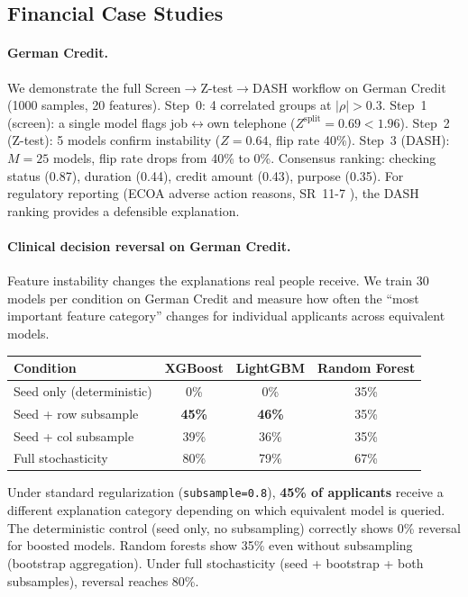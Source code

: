 \documentclass{article}
\begin{document}
\subsection{Financial Case Studies}

\paragraph{German Credit.}
We demonstrate the full Screen$\to$Z-test$\to$DASH workflow on German Credit (1000 samples, 20 features). Step~0: 4 correlated groups at $|\rho| > 0.3$. Step~1 (screen): a single model flags job$\leftrightarrow$own telephone ($Z^{\text{split}} = 0.69 < 1.96$). Step~2 (Z-test): 5 models confirm instability ($Z = 0.64$, flip rate 40\%). Step~3 (DASH): $M = 25$ models, flip rate drops from 40\% to 0\%. Consensus ranking: checking status (0.87), duration (0.44), credit amount (0.43), purpose (0.35). For regulatory reporting (ECOA adverse action reasons, SR~11-7 \citep{occ2011sr117}), the DASH ranking provides a defensible explanation.

\paragraph{Clinical decision reversal on German Credit.}
Feature instability changes the explanations real people receive. We train 30 models per condition on German Credit and measure how often the ``most important feature category'' changes for individual applicants across equivalent models.

\begin{center}
\small
\begin{tabular}{@{}lccc@{}}
\toprule
Condition & XGBoost & LightGBM & Random Forest \\
\midrule
Seed only (deterministic) & 0\% & 0\% & 35\% \\
Seed + row subsample & \textbf{45\%} & \textbf{46\%} & 35\% \\
Seed + col subsample & 39\% & 36\% & 35\% \\
Full stochasticity & 80\% & 79\% & 67\% \\
\bottomrule
\end{tabular}
\end{center}

Under standard regularization (\texttt{subsample=0.8}), \textbf{45\% of applicants} receive a different explanation category depending on which equivalent model is queried. The deterministic control (seed only, no subsampling) correctly shows 0\% reversal for boosted models. Random forests show 35\% even without subsampling (bootstrap aggregation). Under full stochasticity (seed + bootstrap + both subsamples), reversal reaches 80\%.
\end{document}
